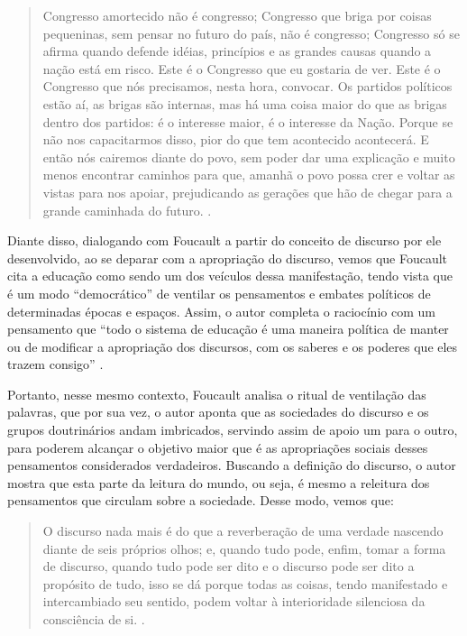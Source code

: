 \begin{refsection}
    \begin{quotation}
        Congresso amortecido não é congresso; Congresso que briga por coisas pequeninas, sem pensar no futuro do país, não é congresso; Congresso só se afirma quando defende idéias, princípios e as grandes causas quando a nação está em risco. Este é o Congresso que eu gostaria de ver. Este é o Congresso que nós precisamos, nesta hora, convocar. Os partidos políticos estão aí, as brigas são internas, mas há uma coisa maior do que as brigas dentro dos partidos: é o interesse maior, é o interesse da Nação. Porque se não nos capacitarmos disso, pior do que tem acontecido acontecerá.  E então nós cairemos diante do povo, sem poder dar uma explicação e muito menos encontrar caminhos para que, amanhã o povo possa crer e voltar as vistas para nos apoiar, prejudicando as gerações que hão de chegar para a grande caminhada do futuro. \cite[p.~185]{Maia2005Dinarte}.
    \end{quotation}

    Diante disso, dialogando com Foucault a partir do conceito de discurso por ele desenvolvido, ao se deparar com a apropriação do discurso, vemos que Foucault cita a educação como sendo um dos veículos dessa manifestação, tendo vista que é um modo ``democrático'' de ventilar os pensamentos e embates políticos de determinadas épocas e espaços. Assim, o autor completa o raciocínio com um pensamento que ``todo o sistema de educação é uma maneira política de manter ou de modificar a apropriação dos discursos, com os saberes e os poderes que eles trazem consigo'' \cite[p.~44]{Foucault1996Ordem}.

    Portanto, nesse mesmo contexto, Foucault analisa o ritual de ventilação das palavras, que por sua vez, o autor aponta que as sociedades do discurso e os grupos doutrinários andam imbricados, servindo assim de apoio um para o outro, para poderem alcançar o objetivo maior que é as apropriações sociais desses pensamentos considerados verdadeiros. Buscando a definição do discurso, o autor mostra que esta parte da leitura do mundo, ou seja, é mesmo a releitura dos pensamentos que circulam sobre a sociedade. Desse modo, vemos que:

    \begin{quotation}
        O discurso nada mais é do que a reverberação de uma verdade nascendo diante de seis próprios olhos; e, quando tudo pode, enfim, tomar a forma de discurso, quando tudo pode ser dito e o discurso pode ser dito a propósito de tudo, isso se dá porque todas as coisas, tendo manifestado e intercambiado seu sentido, podem voltar à interioridade silenciosa da consciência de si. \cite[p.~49]{Foucault1996Ordem}.
    \end{quotation}


\end{refsection}
